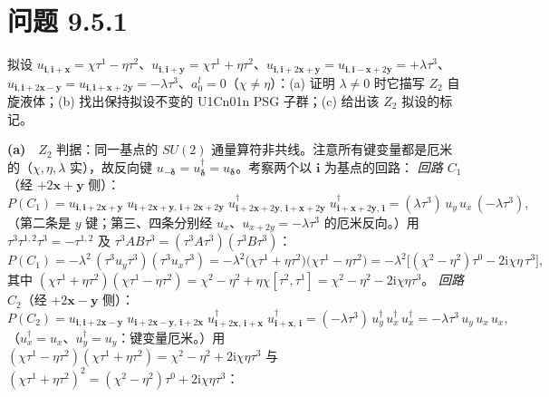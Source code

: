 \section*{问题 9.5.1}
\begin{problem}
拟设 $u_{\pmb{i},\pmb{i}+\pmb{x}}=\chi\tau^1-\eta\tau^2$、$u_{\pmb{i},\pmb{i}+\pmb{y}}=\chi\tau^1+\eta\tau^2$、$u_{\pmb{i},\pmb{i}+2\pmb{x}+\pmb{y}}=u_{\pmb{i},\pmb{i}-\pmb{x}+2\pmb{y}}=+\lambda\tau^3$、$u_{\pmb{i},\pmb{i}+2\pmb{x}-\pmb{y}}=u_{\pmb{i},\pmb{i}+\pmb{x}+2\pmb{y}}=-\lambda\tau^3$、$a_0^l=0$（$\chi\neq\eta$）：(a) 证明 $\lambda\neq0$ 时它描写 $Z_2$ 自旋液体；(b) 找出保持拟设不变的 U1Cn01n PSG 子群；(c) 给出该 $Z_2$ 拟设的标记。
\end{problem}
\solution
\textbf{(a)}　$Z_2$ 判据：同一基点的 $SU(2)$ 通量算符非共线。注意所有键变量都是厄米的（$\chi,\eta,\lambda$ 实），故反向键 $u_{-\pmb{\delta}}=u_{\pmb{\delta}}^{\dagger}=u_{\pmb{\delta}}$。考察两个以 $\pmb{i}$ 为基点的回路：
\emph{回路 $C_1$}（经 $+2\pmb{x}+\pmb{y}$ 侧）：
\begin{equation*}
P(C_1)=u_{\pmb{i},\pmb{i}+2\pmb{x}+\pmb{y}}\;u_{\pmb{i}+2\pmb{x}+\pmb{y},\,\pmb{i}+2\pmb{x}+2\pmb{y}}\;u^{\dagger}_{\pmb{i}+2\pmb{x}+2\pmb{y},\,\pmb{i}+\pmb{x}+2\pmb{y}}\;u^{\dagger}_{\pmb{i}+\pmb{x}+2\pmb{y},\,\pmb{i}}
=(\lambda\tau^3)\,u_y\,u_x\,(-\lambda\tau^3) ,
\end{equation*}
（第二条是 $y$ 键；第三、四条分别经 $u_{x}$、$u_{x+2y}=-\lambda\tau^3$ 的厄米反向。）用 $\tau^3\tau^{1,2}\tau^3=-\tau^{1,2}$ 及 $\tau^3AB\tau^3=(\tau^3A\tau^3)(\tau^3B\tau^3)$：
\begin{equation*}
P(C_1)=-\lambda^{2}\,(\tau^3u_y\tau^3)(\tau^3u_x\tau^3)
=-\lambda^{2}\big(\chi\tau^1+\eta\tau^2\big)\big(\chi\tau^1-\eta\tau^2\big)
=-\lambda^{2}\big[(\chi^{2}-\eta^{2})\tau^{0}-2\mathrm{i}\chi\eta\,\tau^{3}\big],
\end{equation*}
其中 $(\chi\tau^1+\eta\tau^2)(\chi\tau^1-\eta\tau^2)=\chi^2-\eta^2+\eta\chi[\tau^2,\tau^1]=\chi^2-\eta^2-2\mathrm{i}\chi\eta\tau^3$。
\emph{回路 $C_2$}（经 $+2\pmb{x}-\pmb{y}$ 侧）：
\begin{equation*}
P(C_2)=u_{\pmb{i},\pmb{i}+2\pmb{x}-\pmb{y}}\;u_{\pmb{i}+2\pmb{x}-\pmb{y},\,\pmb{i}+2\pmb{x}}\;u^{\dagger}_{\pmb{i}+2\pmb{x},\,\pmb{i}+\pmb{x}}\;u^{\dagger}_{\pmb{i}+\pmb{x},\,\pmb{i}}
=(-\lambda\tau^3)\,u^{\dagger}_y\,u^{\dagger}_x\,u^{\dagger}_x=-\lambda\tau^3\,u_y\,u_x\,u_x ,
\end{equation*}
（$u^{\dagger}_{x}=u_x$、$u^{\dagger}_y=u_y$：键变量厄米。）用 $(\chi\tau^1-\eta\tau^2)(\chi\tau^1+\eta\tau^2)=\chi^2-\eta^2+2\mathrm{i}\chi\eta\tau^3$ 与 $(\chi\tau^1+\eta\tau^2)^2=(\chi^2-\eta^2)\tau^0+2\mathrm{i}\chi\eta\tau^3$：
